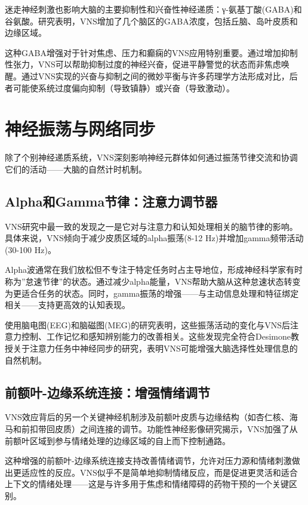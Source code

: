\documentclass[
  Letterpaper,
]{scrbook}
\begin{document}
迷走神经刺激也影响大脑的主要抑制性和兴奋性神经递质：γ-氨基丁酸(GABA)和谷氨酸。研究表明，VNS增加了几个脑区的GABA浓度，包括丘脑、岛叶皮质和边缘区域。

这种GABA增强对于针对焦虑、压力和癫痫的VNS应用特别重要。通过增加抑制性张力，VNS可以帮助抑制过度的神经兴奋，促进平静警觉的状态而非焦虑唤醒。通过VNS实现的兴奋与抑制之间的微妙平衡与许多药理学方法形成对比，后者可能使系统过度偏向抑制（导致镇静）或兴奋（导致激动）。

\section{神经振荡与网络同步}\label{ux795eux7ecfux632fux8361ux4e0eux7f51ux7edcux540cux6b65}

除了个别神经递质系统，VNS深刻影响神经元群体如何通过振荡节律交流和协调它们的活动------大脑的自然计时机制。

\subsection{Alpha和Gamma节律：注意力调节器}\label{alphaux548cgammaux8282ux5f8bux6ce8ux610fux529bux8c03ux8282ux5668}

VNS研究中最一致的发现之一是它对与注意力和认知处理相关的脑节律的影响。具体来说，VNS倾向于减少皮质区域的alpha振荡(8-12
Hz)并增加gamma频带活动(30-100 Hz)。

Alpha波通常在我们放松但不专注于特定任务时占主导地位，形成神经科学家有时称为''怠速节律''的状态。通过减少alpha能量，VNS帮助大脑从这种怠速状态转变为更适合任务的状态。同时，gamma振荡的增强------与主动信息处理和特征绑定相关------支持更高效的认知表现。

使用脑电图(EEG)和脑磁图(MEG)的研究表明，这些振荡活动的变化与VNS后注意力控制、工作记忆和感知辨别能力的改善相关。这些发现完全符合Desimone教授关于注意力任务中神经同步的研究，表明VNS可能增强大脑选择性处理信息的自然机制。

\subsection{前额叶-边缘系统连接：增强情绪调节}\label{ux524dux989dux53f6-ux8fb9ux7f18ux7cfbux7edfux8fdeux63a5ux589eux5f3aux60c5ux7eeaux8c03ux8282}

VNS效应背后的另一个关键神经机制涉及前额叶皮质与边缘结构（如杏仁核、海马和前扣带回皮质）之间连接的调节。功能性神经影像研究揭示，VNS加强了从前额叶区域到参与情绪处理的边缘区域的自上而下控制通路。

这种增强的前额叶-边缘系统连接支持改善情绪调节，允许对压力源和情绪刺激做出更适应性的反应。VNS似乎不是简单地抑制情绪反应，而是促进更灵活和适合上下文的情绪处理------这是与许多用于焦虑和情绪障碍的药物干预的一个关键区别。
\end{document}
